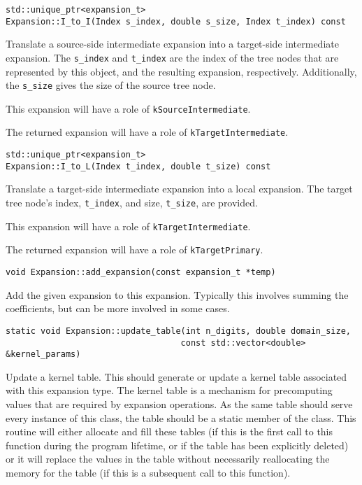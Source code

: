 \begin{lstlisting}
std::unique_ptr<expansion_t> 
Expansion::I_to_I(Index s_index, double s_size, Index t_index) const
\end{lstlisting}

Translate a source-side intermediate expansion into a target-side intermediate
expansion. The \texttt{s\_index} and \texttt{t\_index} are the index of the
tree nodes that are represented by this object, and the resulting expansion,
respectively. Additionally, the \texttt{s\_size} gives the size of the source
tree node.

This expansion will have a role of \texttt{kSourceIntermediate}.

The returned expansion will have a role of \texttt{kTargetIntermediate}.

\begin{lstlisting}
std::unique_ptr<expansion_t> 
Expansion::I_to_L(Index t_index, double t_size) const
\end{lstlisting}


Translate a target-side intermediate expansion into a local expansion. The
target tree node's index, \texttt{t\_index}, and size, \texttt{t\_size},
are provided.

This expansion will have a role of \texttt{kTargetIntermediate}.

The returned expansion will have a role of \texttt{kTargetPrimary}.

\begin{lstlisting}
void Expansion::add_expansion(const expansion_t *temp)
\end{lstlisting}


Add the given expansion to this expansion. Typically this involves summing the
coefficients, but can be more involved in some cases.

\begin{lstlisting}
static void Expansion::update_table(int n_digits, double domain_size, 
                                   const std::vector<double> &kernel_params)
\end{lstlisting}


Update a kernel table. This should generate or update a kernel table associated
with this expansion type. The kernel table is a mechanism for precomputing
values that are required by expansion operations. As the same table should
serve every instance of this class, the table should be a static member of the
class. This routine will either allocate and fill these tables (if this is the
first call to this function during the program lifetime, or if the table has
been explicitly deleted) or it will replace the values in the table without
necessarily reallocating the memory for the table (if this is a subsequent call
to this function).

